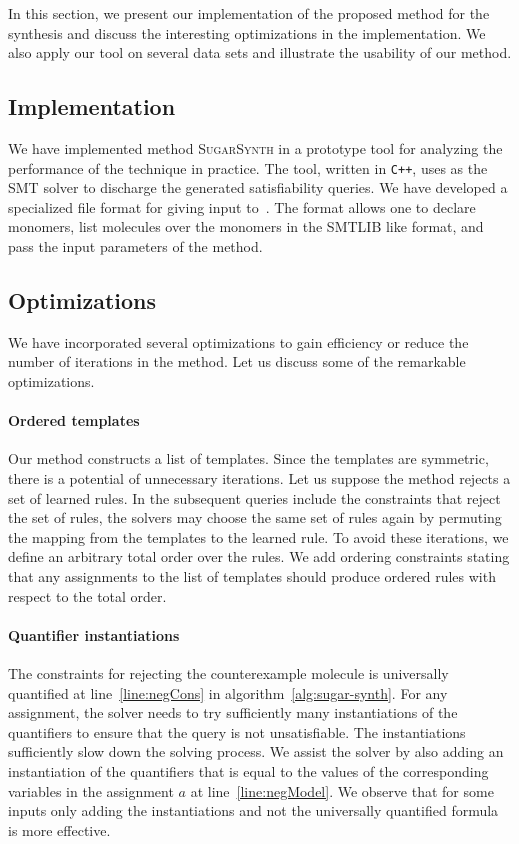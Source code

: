 In this section, we  present our implementation of the proposed method for the synthesis
and discuss the interesting optimizations in the implementation.
%
We also apply our tool on several data sets and illustrate the usability of our method.

\subsection{Implementation} 
We have implemented method \textsc{SugarSynth} in a prototype tool {\ourtool} for
analyzing the performance of the technique in practice.
%
The tool, written in {\tt C++}, uses {\zthree}\cite{z3} as the SMT solver
to discharge the generated satisfiability queries.
%
We have developed a specialized file format for giving input to~\ourtool.
%
The format allows one to declare monomers, list molecules over the monomers
in the SMTLIB like format,
and pass the input parameters of the method.


\subsection{Optimizations}
We have incorporated several optimizations to gain efficiency or reduce
the number of iterations in the method. Let us discuss some of the remarkable
optimizations.

\paragraph{Ordered templates}
Our method constructs a list of templates.
Since the templates are symmetric, there is a potential of unnecessary
iterations.
Let us suppose the method rejects a set of learned rules.
In the subsequent queries include the constraints that reject the set of rules,
the solvers may choose the same set of rules again by permuting the mapping
from the templates to the learned rule.
To avoid these iterations, we define an arbitrary total order over the rules.
We add ordering constraints stating that any assignments to the list of templates should produce
ordered rules with respect to the total order.

\paragraph{Quantifier instantiations}
The constraints for rejecting the counterexample molecule is universally quantified at line~\ref{line:negCons} in algorithm~\ref{alg:sugar-synth}.
For any assignment, the solver needs to try sufficiently many instantiations of the quantifiers
to ensure that the query is not unsatisfiable.
The instantiations sufficiently slow down the solving process.
We assist the solver by also adding an instantiation of the quantifiers that is equal
to the values of the corresponding variables in the assignment $a$ at line~\ref{line:negModel}.
We observe that for some inputs only adding the instantiations and not the universally quantified
formula is more effective.

